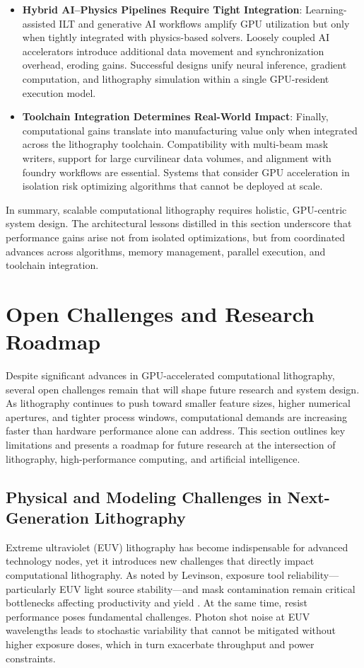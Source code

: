 \documentclass[pdflatex,sn-mathphys-num]{sn-jnl}%
\theoremstyle{thmstyleone}%
\theoremstyle{thmstyletwo}%
\theoremstyle{thmstylethree}%
\begin{document}
\begin{itemize}
\item \textbf{Hybrid AI–Physics Pipelines Require Tight Integration}: Learning-assisted ILT and generative AI workflows amplify GPU utilization but only when tightly integrated with physics-based solvers. Loosely coupled AI accelerators introduce additional data movement and synchronization overhead, eroding gains. Successful designs unify neural inference, gradient computation, and lithography simulation within a single GPU-resident execution model.

\item \textbf{Toolchain Integration Determines Real-World Impact}: Finally, computational gains translate into manufacturing value only when integrated across the lithography toolchain. Compatibility with multi-beam mask writers, support for large curvilinear data volumes, and alignment with foundry workflows are essential. Systems that consider GPU acceleration in isolation risk optimizing algorithms that cannot be deployed at scale.
\end{itemize}

In summary, scalable computational lithography requires holistic, GPU-centric system design. The architectural lessons distilled in this section underscore that performance gains arise not from isolated optimizations, but from coordinated advances across algorithms, memory management, parallel execution, and toolchain integration.



\section{Open Challenges and Research Roadmap}
Despite significant advances in GPU-accelerated computational lithography, several open challenges remain that will shape future research and system design. As lithography continues to push toward smaller feature sizes, higher numerical apertures, and tighter process windows, computational demands are increasing faster than hardware performance alone can address. This section outlines key limitations and presents a roadmap for future research at the intersection of lithography, high-performance computing, and artificial intelligence.

\subsection{Physical and Modeling Challenges in Next-Generation Lithography}
Extreme ultraviolet (EUV) lithography has become indispensable for advanced technology nodes, yet it introduces new challenges that directly impact computational lithography. As noted by Levinson, exposure tool reliability—particularly EUV light source stability—and mask contamination remain critical bottlenecks affecting productivity and yield \cite{levinson2018current}. At the same time, resist performance poses fundamental challenges. Photon shot noise at EUV wavelengths leads to stochastic variability that cannot be mitigated without higher exposure doses, which in turn exacerbate throughput and power constraints.
\end{document}
